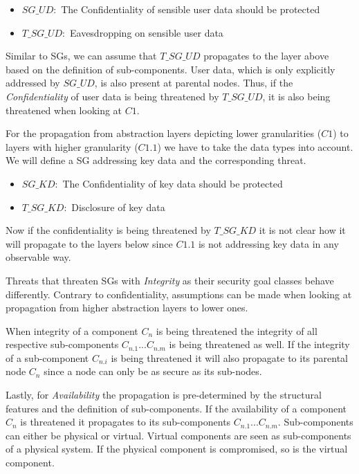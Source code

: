\begin{itemize}
\item[]\textbf{$SG\_UD:$} The Confidentiality of sensible user data should be protected
\item[]\textbf{$T\_SG\_UD:$} Eavesdropping on sensible user data
\end{itemize}

Similar to SGs, we can assume that $T\_SG\_UD$ propagates to the layer above based on the definition of sub-components. User data, which is only explicitly addressed by $SG\_UD$, is also present at parental nodes. Thus, if the \textit{Confidentiality} of user data is being threatened by $T\_SG\_UD$, it is also being threatened when looking at $C1$.

For the propagation from abstraction layers depicting lower granularities ($C1$) to layers with higher granularity ($C1.1$) we have to take the data types into account. We will define a SG addressing key data and the corresponding threat.

\begin{itemize}
\item[]\textbf{$SG\_KD:$} The Confidentiality of key data should be protected
\item[]\textbf{$T\_SG\_KD:$} Disclosure of key data
\end{itemize}

Now if the confidentiality is being threatened by $T\_SG\_KD$ it is not clear how it will propagate to the layers below since $C1.1$ is not addressing key data in any observable way. 

Threats that threaten SGs with \textit{Integrity} as their security goal classes behave differently. Contrary to confidentiality, assumptions can be made when looking at propagation from higher abstraction layers to lower ones.  

When integrity of a component $C_n$ is being threatened the integrity of all respective sub-components $C_{n.1} ... C_{n.m}$ is being threatened as well. If the integrity of a sub-component $C_{n.i}$ is being threatened it will also propagate to its parental node $C_n$ since a node can only be as secure as its sub-nodes.

Lastly, for \textit{Availability} the propagation is pre-determined by the structural features and the definition of sub-components. If the availability of a component $C_n$ is threatened it propagates to its sub-components $C_{n.1} ... C_{n.m}$. Sub-components can either be physical or virtual. Virtual components are seen as sub-components of a physical system. If the physical component is compromised, so is the virtual component.

